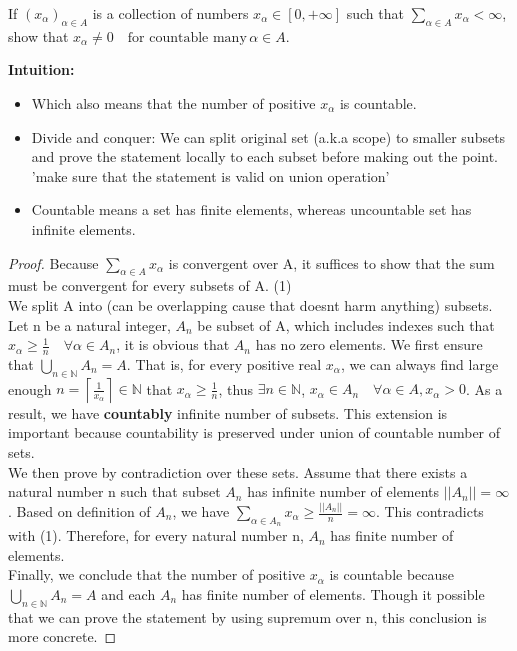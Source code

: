 \begin{exercise}
If $(x_\alpha)_{\alpha \in A}$ is a collection of numbers $x_\alpha \in [0, +\infty]$ such that $\sum_{\alpha \in A} x_\alpha < \infty$, show that  $x_\alpha \neq 0\quad \text{for countable many}\, \alpha\in A$. 
\end{exercise}
\textbf{Intuition:}
\begin{itemize}
    \item Which also means that the number of positive $x_\alpha$ is countable.
    \item Divide and conquer: We can split original set (a.k.a scope) to smaller subsets and prove the statement locally to each subset before making out the point. 'make sure that the statement is valid on union operation'
    \item Countable means a set has finite elements, whereas uncountable set has infinite elements. 
\end{itemize}

\begin{proof}
    Because $\sum_{\alpha \in A} x_\alpha$ is convergent over A, it suffices to show that the sum must be convergent for every subsets of A. (1)\\
    We split A into (can be overlapping cause that doesnt harm anything) subsets. Let n be a natural integer, $A_n$ be subset of A, which includes indexes such that $x_{\alpha} \geq \frac 1 n \quad \forall \alpha \in A_n$, it is obvious that $A_n$ has no zero elements. We first ensure that $\bigcup_{n \in \mathbb{N}} A_n = A$. That is, for every positive real $x_\alpha$, we can always find large enough $n = \left\lceil \frac{1}{x_\alpha} \right\rceil \in \mathbb{N}$ that $x_\alpha \geq \frac 1 n$, thus $\exists n \in \mathbb{N}$, $x_\alpha \in A_n\quad \forall \alpha \in A, x_\alpha > 0$. As a result, we have \textbf{countably} infinite number of subsets. This extension is important because countability is preserved under union of countable number of sets.\\

    We then prove by contradiction over these sets. Assume that there exists a natural number n such that subset $A_n$ has infinite number of elements $||A_n|| = \infty$. Based on definition of $A_n$, we have $\sum_{\alpha \in A_n} x_\alpha \geq \frac {||A_n||} n = \infty$. This contradicts with (1). Therefore, for every natural number n, $A_n$ has finite number of elements.\\

    Finally, we conclude that the number of positive $x_\alpha$ is countable because $\bigcup_{n \in \mathbb{N}} A_n = A$ and each $A_n$ has finite number of elements.  Though it possible that we can prove the statement by using supremum over n, this conclusion is more concrete. 
\end{proof}